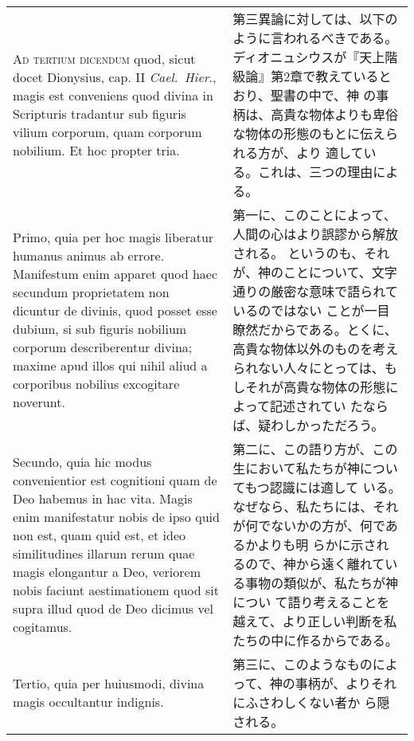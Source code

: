 \documentclass[10pt]{jsarticle} %
\begin{document}
\begin{longtable}{p{21em}p{21em}}
\\


{\scshape Ad tertium dicendum} quod, sicut docet
Dionysius, cap. II {\itshape Cael.~Hier}., magis est conveniens quod divina in
Scripturis tradantur sub figuris vilium corporum, quam corporum
nobilium. Et hoc propter tria. 


&


第三異論に対しては、以下のように言われるべきである。
ディオニュシウスが『天上階級論』第2章で教えているとおり、聖書の中で、神
 の事柄は、高貴な物体よりも卑俗な物体の形態のもとに伝えられる方が、より
 適している。これは、三つの理由による。


\\

Primo, quia per hoc magis liberatur
humanus animus ab errore. Manifestum enim apparet quod haec secundum
proprietatem non dicuntur de divinis, quod posset esse dubium, si sub
figuris nobilium corporum describerentur divina; maxime apud illos qui
nihil aliud a corporibus nobilius excogitare noverunt. 

&

第一に、このことによって、人間の心はより誤謬から解放される。
というのも、それが、神のことについて、文字通りの厳密な意味で語られているのではない
 ことが一目瞭然だからである。とくに、高貴な物体以外のものを考え
 られない人々にとっては、もしそれが高貴な物体の形態によって記述されてい
 たならば、疑わしかっただろう。


\\

Secundo, quia hic
modus convenientior est cognitioni quam de Deo habemus in hac
vita. Magis enim manifestatur nobis de ipso quid non est, quam quid est,
et ideo similitudines illarum rerum quae magis elongantur a Deo,
veriorem nobis faciunt aestimationem quod sit supra illud quod de Deo
dicimus vel cogitamus. 


&

第二に、この語り方が、この生において私たちが神についてもつ認識には適して
 いる。なぜなら、私たちには、それが何でないかの方が、何であるかよりも明
 らかに示されるので、神から遠く離れている事物の類似が、私たちが神につい
 て語り考えることを越えて、より正しい判断を私たちの中に作るからである。


\\

Tertio, quia per huiusmodi, divina magis
occultantur indignis.


&


第三に、このようなものによって、神の事柄が、よりそれにふさわしくない者か
 ら隠される。

\end{longtable}
\newpage
\end{document}
